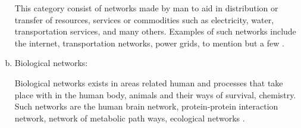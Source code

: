 \documentclass[10pt,a4paper]{article}
\theoremstyle{plain}
\theoremstyle{definition}
\begin{document}
\begin{enumerate}[a.]
	This category consist of networks made by man to aid in distribution or transfer of resources, services or commodities such as electricity, water, transportation services, and many others. Examples of such networks include the internet, transportation networks, power grids, to mention but a few \citep{faloutsos1999power,pagani2013power,banavar1999size}.
	\item Biological networks: 
	
	Biological networks exists in areas related human and processes that take place with in the human body, animals and their ways of survival, chemistry. Such networks are the human brain network, protein-protein interaction network, network of metabolic path ways, ecological networks \citep{estrada2011structure,sporns2004organization,schwikowski2000network}.
\end{enumerate}
\end{document}
